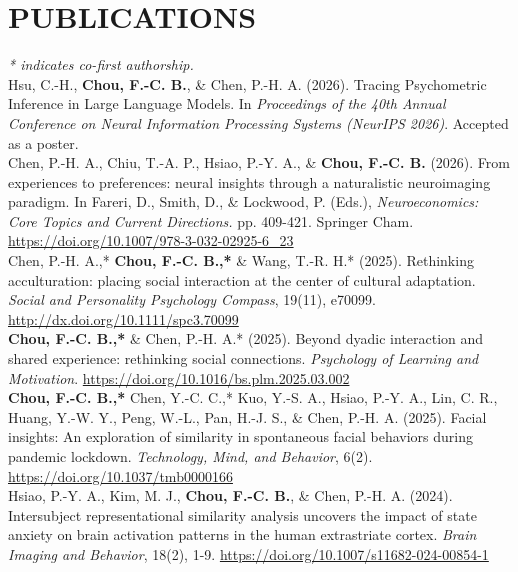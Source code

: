 \documentclass[a4paper,12pt]{article}
\newcommand{\itemspace}{7pt} %
\begin{document}
\section*{PUBLICATIONS}
\textit{* indicates co-first authorship.} \\[10pt]
\noindent Hsu, C.-H., \textbf{Chou, F.-C. B.}, \& Chen, P.-H. A. (2026). Tracing Psychometric Inference in Large Language Models. In \textit{Proceedings of the 40th Annual Conference on Neural Information Processing Systems (NeurIPS 2026)}. Accepted as a poster.\\[\itemspace]
\noindent Chen, P.-H. A., Chiu, T.-A. P., Hsiao, P.-Y. A., \& \textbf{Chou, F.-C. B.} (2026). From experiences to preferences: neural insights through a naturalistic neuroimaging paradigm. In Fareri, D., Smith, D., \& Lockwood, P. (Eds.), \textit{Neuroeconomics: Core Topics and Current Directions.} pp. 409-421. Springer Cham. \href{https://doi.org/10.1007/978-3-032-02925-6_23}{https://doi.org/10.1007/978-3-032-02925-6\_23} \\[\itemspace]
\noindent Chen, P.-H. A.,* \textbf{Chou, F.-C. B.,*} \& Wang, T.-R. H.* (2025). Rethinking acculturation: placing social interaction at the center of cultural adaptation. \textit{Social and Personality Psychology Compass}, 19(11), e70099. \href{http://dx.doi.org/10.1111/spc3.70099}{http://dx.doi.org/10.1111/spc3.70099} \\[\itemspace]
\noindent \textbf{Chou, F.-C. B.,*} \& Chen, P.-H. A.* (2025). Beyond dyadic interaction and shared experience: rethinking social connections. \textit{Psychology of Learning and Motivation}. \href{https://10.1016/bs.plm.2025.03.002}{https://doi.org/10.1016/bs.plm.2025.03.002} \\[\itemspace]
\noindent\textbf{Chou, F.-C. B.,*} Chen, Y.-C. C.,* Kuo, Y.-S. A., Hsiao, P.-Y. A., Lin, C. R., Huang, Y.-W. Y., Peng, W.-L., Pan, H.-J. S., \& Chen, P.-H. A. (2025). Facial insights: An exploration of similarity in spontaneous facial behaviors during pandemic lockdown. \textit{Technology, Mind, and Behavior}, 6(2). \href{https://doi.org/10.1037/tmb0000166}{https://doi.org/10.1037/tmb0000166} \\[\itemspace]
\noindent Hsiao, P.-Y. A., Kim, M. J., \textbf{Chou, F.-C. B.}, \& Chen, P.-H. A. (2024). Intersubject representational similarity analysis uncovers the impact of state anxiety on brain activation patterns in the human extrastriate cortex. \textit{Brain Imaging and Behavior}, 18(2), 1-9. \href{https://doi.org/10.1007/s11682-024-00854-1}{https://doi.org/10.1007/s11682-024-00854-1}\\[\itemspace]
\end{document}
